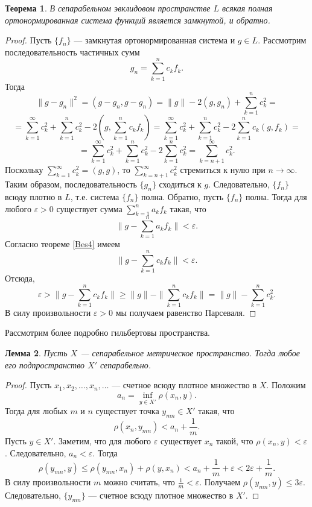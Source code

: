 \documentclass[12pt, titlepage, oneside]{amsbook}
\newtheorem{theorem}{Теорема}[chapter]
\newtheorem{lemma}[theorem]{Лемма}
\theoremstyle{definition}
\theoremstyle{remark}
\begin{document}
\begin{theorem}
	\label{Bes5}
	В сепарабельном эвклидовом пространстве $L$ всякая полная ортонормированная система функций является замкнутой, и обратно.
\end{theorem}

\begin{proof}
	Пусть $\{f_n\}$ --- замкнутая ортонормированная система и $g\in L$. Рассмотрим последовательность частичных сумм $$g_n=\sum\limits_{k=1}^n c_k f_k.$$ Тогда $$\|g-g_n\|^2=(g-g_n,g-g_n)=\|g\|-2(g,g_n)+\sum\limits_{k=1}^n c^2_k=$$ $$=\sum\limits_{k=1}^{\infty} c^2_k+\sum\limits_{k=1}^n c^2_k-2\left(g,\sum\limits_{k=1}^n c_k f_k\right)=\sum\limits_{k=1}^{\infty} c^2_k+\sum\limits_{k=1}^n c^2_k-2\sum\limits_{k=1}^n c_k(g,f_k)=$$ $$=\sum\limits_{k=1}^{\infty} c^2_k+\sum\limits_{k=1}^n c^2_k-2\sum\limits_{k=1}^n c^2_k=\sum\limits_{k=n+1}^{\infty} c^2_k.$$ Поскольку $\sum\limits_{k=1}^{\infty} c_k^2=(g,g)$, то $\sum\limits_{k=n+1}^{\infty} c^2_k$ стремиться к нулю при $n\rightarrow\infty$. Таким образом, последовательность $\{g_n\}$ сходиться к $g$. Следовательно, $\{f_n\}$ всюду плотно в $L$, т.е. система $\{f_n\}$ полна. Обратно, пусть $\{f_n\}$ полна. Тогда для любого $\varepsilon>0$ существует сумма $\sum\limits_{k=1}^{n} a_k f_k$ такая, что $$\|g-\sum\limits_{k=1}^{n} a_k f_k\|<\varepsilon.$$ Согласно теореме \ref{Bes4} имеем $$\|g-\sum\limits_{k=1}^{n} c_k f_k\|<\varepsilon.$$ Отсюда, $$\varepsilon>\|g-\sum\limits_{k=1}^{n} c_k f_k\|\geq\|g\|-\|\sum\limits_{k=1}^{n} c_k f_k\|=\|g\|-\sum\limits_{k=1}^{n} c^2_k.$$ В силу произвольности $\varepsilon>0$ мы получаем равенство Парсеваля.
\end{proof}

Рассмотрим более подробно гильбертовы пространства.

\begin{lemma}
	\label{LHil1}
	Пусть $X$ --- сепарабельное метрическое пространство. Тогда любое его подпространство $X'$ сепарабельно.
\end{lemma}

\begin{proof}
	Пусть $x_1,x_2,\ldots,x_n,\ldots$ --- счетное всюду плотное множество в $X$. Положим $$a_n=\inf\limits_{y\in X'}\rho(x_n,y).$$ Тогда для любых $m$ и $n$ существует точка $y_{mn}\in X'$ такая, что $$\rho(x_n,y_{mn})<a_n+\frac{1}{m}.$$ Пусть $y\in X'$. Заметим, что для любого $\varepsilon$ существует $x_n$ такой, что $\rho(x_n,y)<\varepsilon$. Следовательно, $a_n<\varepsilon$. Тогда $$\rho(y_{mn},y)\leq\rho(y_{mn},x_n)+\rho(y,x_n)<a_n+\frac{1}{m}+\varepsilon<2\varepsilon+\frac{1}{m}.$$ В силу произвольности $m$ можно считать, что $\frac{1}{m}<\varepsilon$. Получаем $\rho(y_{mn},y)\leq3\varepsilon$. Следовательно, $\{y_{mn}\}$ --- счетное всюду плотное множество в $X'$.
\end{proof}
\end{document}
